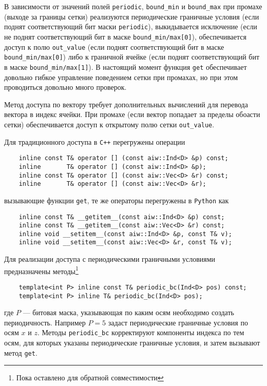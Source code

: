 В зависимости от значений полей \verb'periodic', \verb'bound_min' и \verb'bound_max' при промахе (выходе за границы сетки)
реализуются периодические граничные условия (если поднят соответствующий бит маски \verb'periodic'), выкидывается исключение (если не поднят соответствующий  бит
в маске \verb'bound_min/max[0]'),
обеспечивается доступ к полю \verb'out_value' (если поднят соответствующий  бит
в маске \verb'bound_min/max[0]') либо к граничной ячейке (если поднят соответствующий  бит
в маске \verb'bound_min/max[1]').
В настоящий момент функция \verb'get' обеспечивает довольно гибкое управление поведением сетки при промахах, но при этом проводиться довольно много проверок.

Метод доступа по вектору требует дополнительных вычислений для перевода вектора в индекс ячейки. 
При промахе (если вектор попадает за пределы обоасти сетки) обеспечивается доступ к открытому полю сетки \verb'out_value'.

Для традиционного доступа в \verb'С++' перегружены операции 
\begin{verbatim}
    inline const T& operator [] (const aiw::Ind<D> &p) const;
    inline       T& operator [] (const aiw::Ind<D> &p);
    inline const T& operator [] (const aiw::Vec<D> &r) const;
    inline       T& operator [] (const aiw::Vec<D> &r);
\end{verbatim}
вызывающие функции \verb'get', те же операторы перегружены в \verb'Python' как
\begin{verbatim}
    inline const T& __getitem__(const aiw::Ind<D> &p) const;
    inline const T& __getitem__(const aiw::Vec<D> &r) const;
    inline void __setitem__(const aiw::Ind<D> &p, const T& v);
    inline void __setitem__(const aiw::Vec<D> &r, const T& v);
\end{verbatim}

Для реализации доступа с периодическими граничными условиями предназначены методы\footnote{Пока оставлено для обратной совместимости}
\begin{verbatim}
    template<int P> inline const T& periodic_bc(Ind<D> pos) const;
    template<int P> inline T& periodic_bc(Ind<D> pos);
\end{verbatim}
где $P$ --- битовая маска, указывающая по каким осям необходимо создать периодичность.
Например $P=5$ задаст периодические граничные условия по осям $x$ и $z$.
Методы \verb'periodic_bc' корректируют компоненты индекса по тем осям, для которых указаны периодические граничные условия,
и затем вызывают метод \verb'get'.

